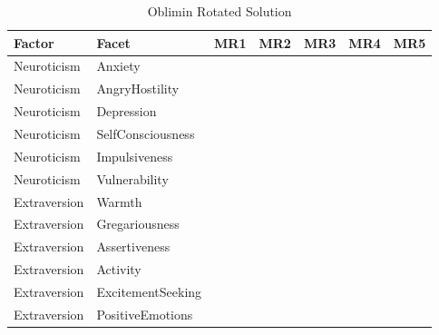 \documentclass{article}\usepackage[]{graphicx}\usepackage[]{color}
\begin{document}
\begin{table}
\caption{\label{tab:unnamed-chunk-11}Oblimin Rotated Solution}
\centering
\begin{tabular}[t]{lllllll}
\toprule
Factor & Facet & MR1 & MR2 & MR3 & MR4 & MR5\\
\midrule
Neuroticism & Anxiety & \cellcolor{white}{0.02} & \cellcolor{yellow}{0.85} & \cellcolor{white}{0.16} & \cellcolor{white}{0.05} & \cellcolor{white}{0.12}\\
Neuroticism & AngryHostility & \cellcolor{white}{0.01} & \cellcolor{yellow}{0.55} & \cellcolor{white}{0.04} & \cellcolor{yellow}{-0.61} & \cellcolor{white}{0.02}\\
Neuroticism & Depression & \cellcolor{white}{-0.05} & \cellcolor{yellow}{0.87} & \cellcolor{white}{-0.12} & \cellcolor{white}{-0.01} & \cellcolor{white}{0.1}\\
Neuroticism & SelfConsciousness & \cellcolor{white}{-0.08} & \cellcolor{yellow}{0.77} & \cellcolor{white}{0.14} & \cellcolor{white}{0.16} & \cellcolor{white}{0.06}\\
Neuroticism & Impulsiveness & \cellcolor{white}{0.37} & \cellcolor{white}{0.48} & \cellcolor{white}{-0.07} & \cellcolor{white}{-0.18} & \cellcolor{white}{0.24}\\
\addlinespace
Neuroticism & Vulnerability & \cellcolor{white}{-0.06} & \cellcolor{yellow}{0.82} & \cellcolor{white}{-0.1} & \cellcolor{white}{0.04} & \cellcolor{white}{0.01}\\
Extraversion & Warmth & \cellcolor{yellow}{0.86} & \cellcolor{white}{0} & \cellcolor{white}{0.3} & \cellcolor{white}{0.19} & \cellcolor{white}{0.32}\\
Extraversion & Gregariousness & \cellcolor{yellow}{0.72} & \cellcolor{white}{-0.09} & \cellcolor{white}{0.18} & \cellcolor{white}{-0.06} & \cellcolor{white}{0.23}\\
Extraversion & Assertiveness & \cellcolor{yellow}{0.57} & \cellcolor{white}{-0.26} & \cellcolor{white}{0.4} & \cellcolor{white}{-0.28} & \cellcolor{white}{0.17}\\
Extraversion & Activity & \cellcolor{yellow}{0.58} & \cellcolor{white}{-0.03} & \cellcolor{white}{0.5} & \cellcolor{white}{-0.24} & \cellcolor{white}{0.31}\\
\addlinespace
Extraversion & ExcitementSeeking & \cellcolor{white}{0.5} & \cellcolor{white}{-0.02} & \cellcolor{white}{0.08} & \cellcolor{white}{-0.13} & \cellcolor{white}{0.42}\\
Extraversion & PositiveEmotions & \cellcolor{yellow}{0.75} & \cellcolor{white}{-0.2} & \cellcolor{white}{0.31} & \cellcolor{white}{0.14} & \cellcolor{white}{0.5}\\

\end{tabular}
\end{table}
\end{document}
